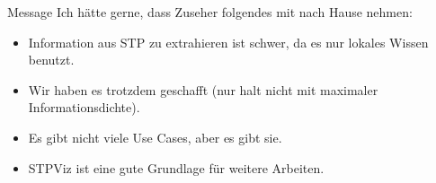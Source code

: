 \documentclass{beamer}
\begin{document}
\begin{frame}{Message}
Ich hätte gerne, dass Zuseher folgendes mit nach Hause nehmen:\\
\begin{itemize}
    \item Information aus STP zu extrahieren ist schwer, da es nur lokales Wissen benutzt.
    \item Wir haben es trotzdem geschafft (nur halt nicht mit maximaler Informationsdichte).
    \item Es gibt nicht viele Use Cases, aber es gibt sie.
    \item STPViz ist eine gute Grundlage für weitere Arbeiten.
\end{itemize}
\end{frame}
\end{document}
